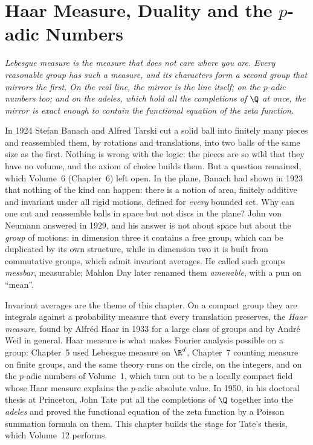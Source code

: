 \chapter{Haar Measure, Duality and the \texorpdfstring{$p$}{p}-adic Numbers}

\begin{center}\itshape
Lebesgue measure is the measure that does not care where you are. Every reasonable group has such a measure, and its characters
form a second group that mirrors the first. On the real line, the mirror is the line itself; on the $p$-adic numbers too; and on the
adeles, which hold all the completions of $\Q$ at once, the mirror is exact enough to contain the functional equation of the zeta
function.
\end{center}

In 1924 Stefan Banach and Alfred Tarski cut a solid ball into finitely many pieces and reassembled them, by rotations and translations, into
two balls of the same size as the first. Nothing is wrong with the logic: the pieces are so wild that they have no volume, and the
axiom of choice builds them. But a question remained, which Volume~6 (Chapter~6) left open. In the plane, Banach had shown in 1923
that nothing of the kind can happen: there is a notion of area, finitely additive and invariant under all rigid motions, defined for
\emph{every} bounded set. Why can one cut and reassemble balls in space but not discs in the plane? John von Neumann answered in 1929, and his
answer is not about space but about the \emph{group} of motions: in dimension three it contains a free group, which can be
duplicated by its own structure, while in dimension two it is built from commutative groups, which admit invariant averages. He
called such groups \emph{messbar}, measurable; Mahlon Day later renamed them \emph{amenable}, with a pun on ``mean''.

Invariant averages are the theme of this chapter. On a compact group they are integrals against a probability measure that every
translation preserves, the \emph{Haar measure}, found by Alfr\'ed Haar in 1933 for a large class of groups and by Andr\'e Weil in general. Haar measure is what
makes Fourier analysis possible on a group: Chapter~5 used Lebesgue measure on $\R^d$, Chapter~7 counting measure on finite groups, and
the same theory runs on the circle, on the integers, and on the $p$-adic numbers of Volume~1, which turn out to be a locally compact field
whose Haar measure explains the $p$-adic absolute value. In 1950, in his doctoral thesis at Princeton, John Tate put all the completions
of $\Q$ together into the \emph{adeles} and proved the functional equation of the zeta function by a Poisson summation formula on them.
This chapter builds the stage for Tate's thesis, which Volume~12 performs.

